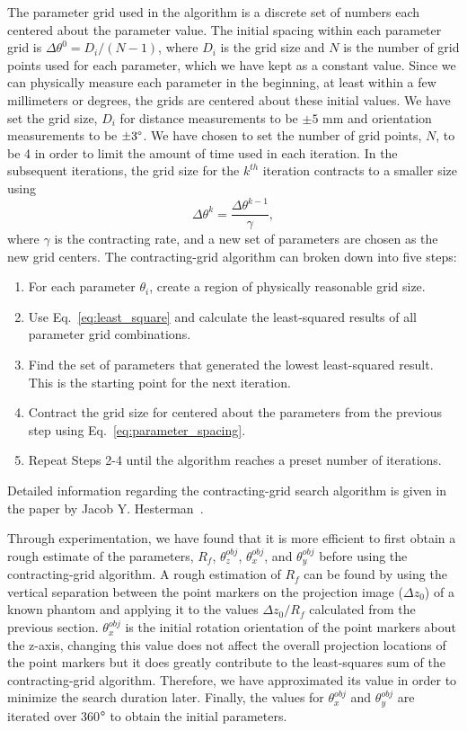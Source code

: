 The parameter grid used in the algorithm is a discrete set of numbers each centered about the parameter value.  The initial spacing within each parameter grid is $\Delta \theta^0 = D_i/(N-1)$, where $D_i$ is the grid size and $N$ is the number of grid points used for each parameter, which we have kept as a constant value.  Since we can physically measure each parameter in the beginning, at least within a few millimeters or degrees, the grids are centered about these initial values.  We have set the grid size, $D_i$ for distance measurements to be $\pm 5$ mm and orientation measurements to be $\pm 3 \degree$.  We have chosen to set the number of grid points, $N$, to be 4 in order to limit the amount of time used in each iteration.  In the subsequent iterations, the grid size for the $k^{th}$ iteration contracts to a smaller size using
%
\begin{equation}
\label{eq:parameter_spacing}
\Delta \theta^k = \frac{\Delta \theta^{k-1}}{\gamma},
\end{equation}
%
where $\gamma$ is the contracting rate, and a new set of parameters are chosen as the new grid centers.  The contracting-grid algorithm can broken down into five steps:
%
\begin{enumerate}
\item For each parameter $\theta_i$, create a region of physically reasonable grid size.
\item Use Eq.~\ref{eq:least_square} and calculate the least-squared results of all parameter grid combinations.
\item Find the set of parameters that generated the lowest least-squared result.  This is the starting point for the next iteration.
\item Contract the grid size for centered about the parameters from the previous step using Eq.~\ref{eq:parameter_spacing}.
\item Repeat Steps 2-4 until the algorithm reaches a preset number of iterations.
\end{enumerate}
Detailed information regarding the contracting-grid search algorithm is given in the paper by Jacob Y. Hesterman~\citep{Hesterman2010}.  

Through experimentation, we have found that it is more efficient to first obtain a rough estimate of the parameters, $R_f$, $\theta^{obj}_z$, $\theta^{obj}_x$, and $\theta^{obj}_y$ before using the contracting-grid algorithm.  A rough estimation of $R_f$ can be found by using the vertical separation between the point markers on the projection image ($\Delta z_0$) of a known phantom and applying it to the values $\Delta z_0/R_f$ calculated from the previous section.  $\theta^{obj}_x$ is the initial rotation orientation of the point markers about the z-axis, changing this value does not affect the overall projection locations of the point markers but it does greatly contribute to the least-squares sum of the contracting-grid algorithm.  Therefore, we have approximated its value in order to minimize the search duration later.  Finally, the values for $\theta_x^{obj}$ and $\theta_y^{obj}$ are iterated over 360$\degree$ to obtain the initial parameters.

